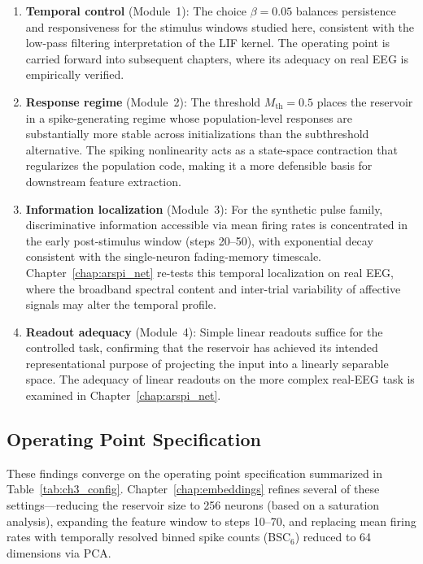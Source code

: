 \begin{enumerate}
    \item \textbf{Temporal control} (Module~1): The choice $\beta = 0.05$ balances persistence and responsiveness for the stimulus windows studied here, consistent with the low-pass filtering interpretation of the LIF kernel. The operating point is carried forward into subsequent chapters, where its adequacy on real EEG is empirically verified.

    \item \textbf{Response regime} (Module~2): The threshold $M_{\text{th}} = 0.5$ places the reservoir in a spike-generating regime whose population-level responses are substantially more stable across initializations than the subthreshold alternative. The spiking nonlinearity acts as a state-space contraction that regularizes the population code, making it a more defensible basis for downstream feature extraction.

    \item \textbf{Information localization} (Module~3): For the synthetic pulse family, discriminative information accessible via mean firing rates is concentrated in the early post-stimulus window (steps 20--50), with exponential decay consistent with the single-neuron fading-memory timescale. Chapter~\ref{chap:arspi_net} re-tests this temporal localization on real EEG, where the broadband spectral content and inter-trial variability of affective signals may alter the temporal profile.

    \item \textbf{Readout adequacy} (Module~4): Simple linear readouts suffice for the controlled task, confirming that the reservoir has achieved its intended representational purpose of projecting the input into a linearly separable space. The adequacy of linear readouts on the more complex real-EEG task is examined in Chapter~\ref{chap:arspi_net}.
\end{enumerate}

\subsection{Operating Point Specification}
\label{sec:validated_configuration}

These findings converge on the operating point specification summarized in Table~\ref{tab:ch3_config}. Chapter~\ref{chap:embeddings} refines several of these settings---reducing the reservoir size to 256 neurons (based on a saturation analysis), expanding the feature window to steps 10--70, and replacing mean firing rates with temporally resolved binned spike counts (BSC$_6$) reduced to 64 dimensions via PCA.

